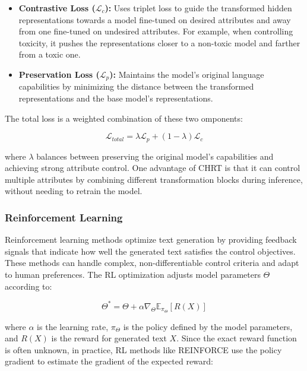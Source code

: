 \begin{itemize}
   \item \textbf{Contrastive Loss ($\mathcal{L}_c$):} Uses triplet loss to guide the transformed hidden representations towards a model fine-tuned on desired attributes and away from one fine-tuned on undesired attributes. For example, when controlling toxicity, it pushes the representations closer to a non-toxic model and farther from a toxic one.
   
   \item \textbf{Preservation Loss ($\mathcal{L}_p$):} Maintains the model's original language capabilities by minimizing the distance between the transformed representations and the base model's representations.
\end{itemize}

The total loss is a weighted combination of these two omponents:

\begin{equation}
    \mathcal{L}_{total} = \lambda\mathcal{L}_p + (1-\lambda)\mathcal{L}_c
\end{equation}

where $\lambda$ balances between preserving the original model's capabilities and achieving strong attribute control. One advantage of CHRT is that it can control multiple attributes by combining different transformation blocks during inference, without needing to retrain the model.

\subsubsection{Reinforcement Learning}

Reinforcement learning methods optimize text generation by providing feedback signals that indicate how well the generated text satisfies the control objectives. 
These methods can handle complex, non-differentiable control criteria and adapt to human preferences. 
The RL optimization adjusts model parameters $\Theta$ according to:

\begin{equation}
   \Theta^* = \Theta + \alpha\nabla_\Theta \mathbb{E}_{\pi_\Theta}[R(X)]
\end{equation}

where $\alpha$ is the learning rate, $\pi_\Theta$ is the policy defined by the model parameters, and $R(X)$ is the reward for generated text $X$. 
Since the exact reward function is often unknown, in practice, RL methods like REINFORCE \cite{10.1007/BF00992696} use the policy gradient to estimate the gradient of the expected reward:


